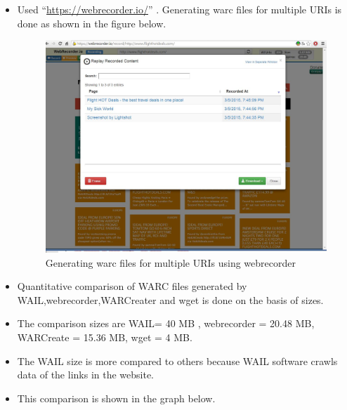 \begin{itemize}
	\item Used ``\url{https://webrecorder.io/}'' . Generating warc files for multiple URIs is done as shown in the figure below.
		\begin{figure}
		  	 \begin{center}
		  	 		\includegraphics[scale=0.40]{webrecorderWarc.jpg}
		  	 		\caption{Generating warc files for multiple URIs using webrecorder}
			  \end{center}
		  \end{figure}	
	\item Quantitative comparison of WARC files generated by WAIL,webrecorder,WARCreater and wget is done on the basis of sizes.
	\item The comparison sizes are WAIL= 40 MB , webrecorder = 20.48 MB, WARCreate = 15.36 MB, wget = 4 MB.
	\item The WAIL size is more compared to others because WAIL software crawls data of the links in the website.
	\item This comparison is shown in the graph below.
	

\end{itemize}
